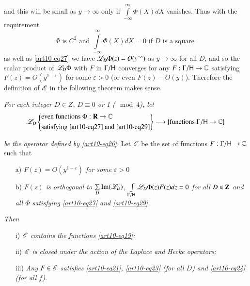 and this will be small as $y \to \infty$ only if $\int\limits^\infty_{-\infty} \Phi (X) dX$ vanishes. Thus with the requirement
\begin{equation*}
\Phi \text{ is } C^2 \text{ and } \int\limits^\infty_{-\infty} \Phi (X) d X = 0 \text{ if } D \text{ is a square } \tag{29}\label{art10-eq29}
\end{equation*}
as well as \eqref{art10-eq27} we have $\mathscr{L}_D \Phi (z) = O(y^{-\varepsilon})$ as $y \to \infty$ for all $D$, and so the scalar product of $\mathscr{L}_D \Phi$ with $F$ in $\Gamma / \mathsf{H}$ converges for any $F :\Gamma / \mathsf{H} \to \mathbb{C}$ satisfying $F(z) = O(y^{1-\varepsilon})$ for some $\varepsilon > 0$ (or even $F(z) - O(y)$). Therefore the definition of $\mathscr{E}$ in the following theorem makes sense. 

\begin{theorem*}
\textit{For each integer $D \in Z$, $D \equiv 0$ or 1 ($\mod 4$), let }
$$
\mathscr{L}_D \left\{\begin{aligned}
& \text{even functions } \Phi: \mathbf{R} \to\mathbb{C}\\
& \text{satisfying \eqref{art10-eq27} and \eqref{art10-eq29}}
\end{aligned}
\right\} \longrightarrow \{\text{functions } \Gamma /\mathsf{H} \to \mathbb{C} \}
$$
\end{theorem*}
\textit{be the operator defined by \eqref{art10-eq26}}. Let $\mathscr{E}$ be the set of functions $F: \Gamma / \mathsf{H} \to \mathbb{C}$ such that 
\begin{itemize}
\item[a)] \textit{$F(z) = O(y^{1-\varepsilon})$ for some  $\varepsilon > 0$}

\item[b)] \textit{$F (z)$  is orthogonal to  $\sum\limits_D \operatorname{Im} (\mathscr{L}_D)$, \ie $\int\limits_{\Gamma / \mathsf{H}} \mathscr{L}_D \Phi (z) F(z) d z = 0$ for all $D \in \mathbf{Z}$ and all $\Phi$ satisfying \eqref{art10-eq27} and \eqref{art10-eq29}.}
\end{itemize}

\textit{Then }
\begin{itemize}
\item[i)] \textit{$\mathscr{E}$ contains the functions \eqref{art10-eq19};}

\item[ii)] \textit{$\mathscr{E}$ is closed under the action of the Laplace and Hecke operators;}

\item[iii)] \textit{Any $F \in \mathscr{E}$ satisfies \eqref{art10-eq21}, \eqref{art10-eq23} (for all $D$) and \eqref{art10-eq24} (for all $f$).}
\end{itemize}

